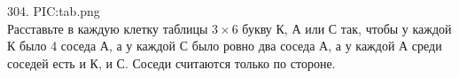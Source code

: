 304. {{PIC:tab.png}}\\
Расставьте в каждую клетку таблицы $3\times6$ букву К, А или С так, чтобы у каждой К было 4 соседа А, а у каждой С было ровно два соседа А, а у каждой А среди соседей есть и К, и С. Соседи считаются только по стороне.\\
